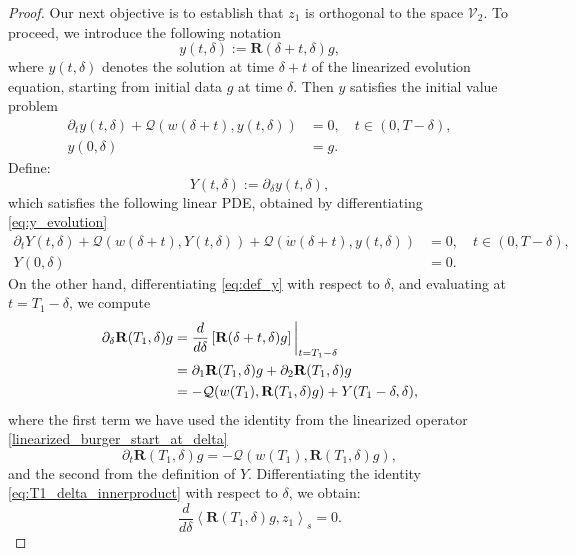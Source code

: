 \documentclass[10pt, reqno]{amsart}
\numberwithin{equation}{section}
\begin{document}
\begin{proof}
Our next objective is to establish that \( z_1 \) is orthogonal to the space \( \mathcal{V}_2 \). To proceed, we introduce the following notation
\begin{equation} \label{eq:def_y}
	y(t, \delta) := \mathbf{R}(\delta + t, \delta)g,
\end{equation}
where \( y(t, \delta) \) denotes the solution at time \( \delta + t \) of the linearized evolution equation, starting from initial data \( g \) at time \( \delta \). Then \( y \) satisfies the initial value problem
\begin{align}
	\partial_t y(t, \delta) + \mathcal{Q}(w(\delta + t), y(t, \delta)) &= 0, \quad t \in (0, T - \delta), \label{eq:y_evolution}\\
	y(0, \delta) &= g. \label{eq:y_initial}
\end{align}
Define:
\[
Y(t, \delta) := \partial_\delta y(t, \delta),
\]
which satisfies the following linear PDE, obtained by differentiating \eqref{eq:y_evolution}
\begin{align}
	\partial_t Y(t, \delta) + \mathcal{Q}(w(\delta + t), Y(t, \delta)) + \mathcal{Q}(\dot{w}(\delta + t), y(t, \delta)) &= 0, \quad t \in (0, T - \delta), \label{eq:Y_evolution}\\
	Y(0, \delta) &= 0. \label{eq:Y_initial}
\end{align}
On the other hand, differentiating \eqref{eq:def_y} with respect to \( \delta \), and evaluating at \( t = T_1 - \delta \), we compute
\begin{align}
	\partial_\delta \mathbf{R}(T_1, \delta)g &= \frac{d}{d\delta} \left[\mathbf{R}(\delta + t, \delta)g\right] \bigg|_{t = T_1 - \delta} \notag\\
	&= \partial_1 \mathbf{R}(T_1, \delta)g + \partial_2 \mathbf{R}(T_1, \delta)g \notag\\
	&= -\mathcal{Q}(w(T_1), \mathbf{R}(T_1, \delta)g) + Y(T_1 - \delta, \delta), \label{derivative_R_delta}
\end{align}
where the first term we have used the identity from the linearized operator \eqref{linearized_burger_start_at_delta}
\[
\partial_t \mathbf{R}(T_1, \delta)g = -\mathcal{Q}(w(T_1), \mathbf{R}(T_1, \delta)g),
\]
and the second from the definition of \( Y \). 
Differentiating the identity \eqref{eq:T1_delta_innerproduct} with respect to \( \delta \), we obtain:
\begin{equation}\label{eq:delta_inner_product_derivative}
	\frac{d}{d\delta} \left\langle \mathbf{R}(T_1, \delta)g, z_1 \right\rangle_s = 0.
\end{equation}

\end{proof}
\end{document}
